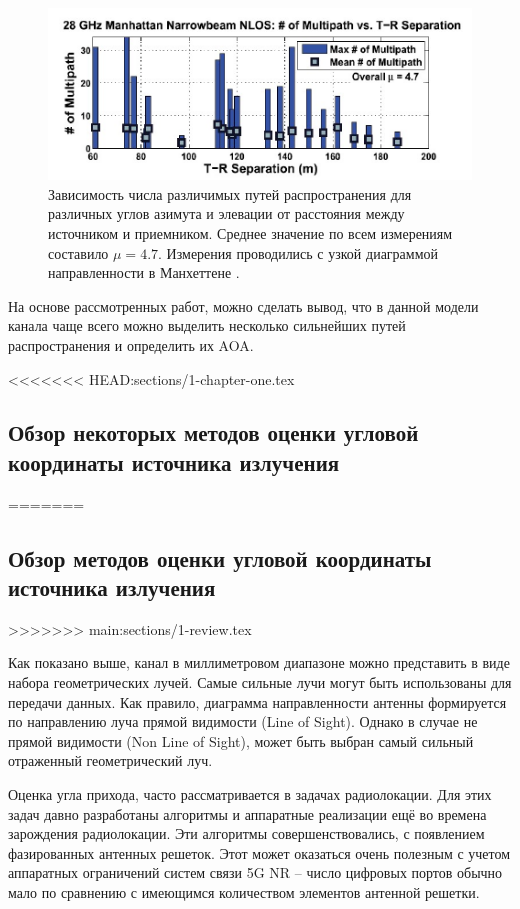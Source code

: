 \begin{figure}[ht]
    \centering
    \includegraphics[width=0.8\linewidth]{figs/fig3.2}
    \caption{
        Зависимость числа различимых путей распространения для различных углов азимута и элевации от расстояния между источником и приемником.
        Среднее значение по всем измерениям составило $\mu=4.7$. Измерения проводились с узкой диаграммой направленности в Манхеттене \cite{Rappaport2015}.}
    \label{fig:3.2}
\end{figure}

На основе рассмотренных работ, можно сделать вывод, что в данной модели
канала чаще всего можно выделить несколько сильнейших путей
распространения и определить их AOA.

<<<<<<< HEAD:sections/1-chapter-one.tex
\subsection{Обзор некоторых методов оценки угловой координаты источника излучения}
=======
\subsection{Обзор методов оценки угловой координаты источника излучения}
\label{sec:review}
>>>>>>> main:sections/1-review.tex

Как показано выше, канал в миллиметровом диапазоне можно представить в виде
набора геометрических лучей.  Самые сильные лучи могут быть
использованы для передачи данных. Как правило, диаграмма направленности
антенны формируется по направлению луча прямой видимости (Line of Sight).
Однако в случае не прямой видимости (Non Line of Sight), может быть
выбран самый сильный отраженный геометрический луч. 

Оценка угла прихода, часто рассматривается в задачах
радиолокации.  Для этих задач  давно разработаны алгоритмы и аппаратные реализации
ещё во времена зарождения радиолокации. Эти алгоритмы совершенствовались, с
появлением фазированных антенных решеток.  
Этот может оказаться очень  полезным с учетом  аппаратных ограничений систем
связи 5G NR -- число цифровых портов обычно мало по сравнению с имеющимся
количеством элементов антенной решетки. 


